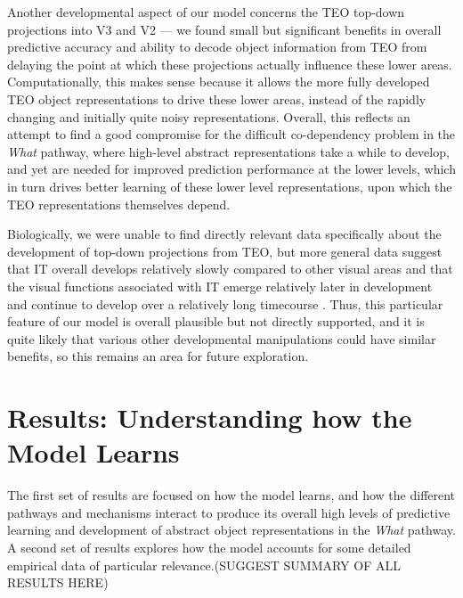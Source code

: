 \documentclass[11pt,twoside]{article}
\newif\myifpdf
\begin{document}
Another developmental aspect of our model concerns the TEO top-down projections into V3 and V2 --- we found small but significant benefits in overall predictive accuracy and ability to decode object information from TEO from delaying the point at which these projections actually influence these lower areas.  Computationally, this makes sense because it allows the more fully developed TEO object representations to drive these lower areas, instead of the rapidly changing and initially quite noisy representations.  Overall, this reflects an attempt to find a good compromise for the difficult co-dependency problem in the {\em What} pathway, where high-level abstract representations take a while to develop, and yet are needed for improved prediction performance at the lower levels, which in turn drives better learning of these lower level representations, upon which the TEO representations themselves depend.

Biologically, we were unable to find directly relevant data specifically about the development of top-down projections from TEO, but more general data suggest that IT overall develops relatively slowly compared to other visual areas \cite{Rodman94} and that the visual functions associated with IT emerge relatively later in development and continue to develop over a relatively long timecourse \cite{NishimuraScherfBehrmann09}.  Thus, this particular feature of our model is overall plausible but not directly supported, and it is quite likely that various other developmental manipulations could have similar benefits, so this remains an area for future exploration.

\section{Results: Understanding how the Model Learns}

The first set of results are focused on how the model learns, and how the different pathways and mechanisms interact to produce its overall high levels of predictive learning and development of abstract object representations in the {\em What} pathway.  A second set of results explores how the model accounts for some detailed empirical data of particular relevance.(SUGGEST SUMMARY OF ALL RESULTS HERE)
\end{document}
